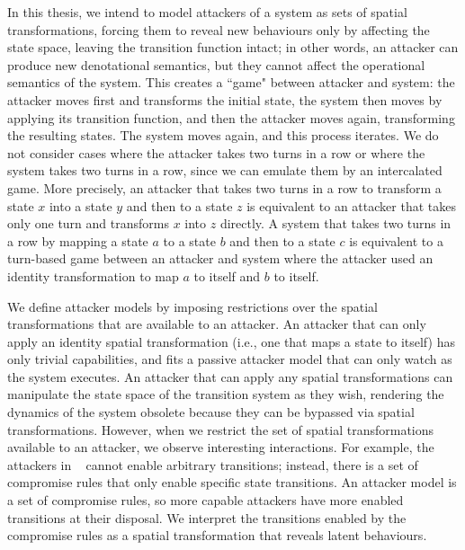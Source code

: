 In this thesis, we intend to model attackers of a system as sets of spatial transformations, forcing them to reveal new behaviours only by affecting the state space, leaving the transition function intact; in other words, an attacker can produce new denotational semantics, but they cannot affect the operational semantics of the system. This creates a ``game" between attacker and system: the attacker moves first and transforms the initial state, the system then moves by applying its transition function, and then the attacker moves again, transforming the resulting states. The system moves again, and this process iterates. We do not consider cases where the attacker takes two turns in a row or where the system takes two turns in a row, since we can emulate them by an intercalated game. More precisely, an attacker that takes two turns in a row to transform a state $x$ into a state $y$ and then to a state $z$ is equivalent to an attacker that takes only one turn and transforms $x$ into $z$ directly. A system that takes two turns in a row by mapping a state $a$ to a state $b$ and then to a state $c$ is equivalent to a turn-based game between an attacker and system where the attacker used an identity transformation to map $a$ to itself and $b$ to itself. 

We define attacker models by imposing restrictions over the spatial transformations that are available to an attacker. An attacker that can only apply an identity spatial transformation (i.e., one that maps a state to itself) has only trivial capabilities, and fits a passive attacker model that can only watch as the system executes. An attacker that can apply any spatial transformations can manipulate the state space of the transition system as they wish, rendering the dynamics of the system obsolete because they can be bypassed via spatial transformations. However, when we restrict the set of spatial transformations available to an attacker, we observe interesting interactions. For example, the attackers in ~\cite{KnowYourEnemy} cannot enable arbitrary transitions; instead, there is a set of
compromise rules that only enable specific state transitions. An attacker model is a set of compromise rules, so more capable attackers have more enabled transitions at their disposal. We interpret the transitions enabled by the compromise rules as a spatial transformation that reveals latent behaviours. 

